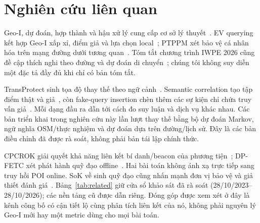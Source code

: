 \section{Nghiên cứu liên quan}\label{sec:related}
Geo-I, dự đoán, hợp thành và hậu xử lý cung cấp cơ sở
lý thuyết~\cite{geoi,predictive,dworkroth}. EV querying kết hợp Geo-I xấp xỉ,
điểm giả và lựa chọn local~\cite{ev}; PTPPM xét bảo vệ cá nhân hóa trên mạng
đường dưới tương quan~\cite{ptppm}. Tóm tắt chương trình IWPE 2026 cũng đề cập
thích nghi theo đường và dự đoán di chuyển~\cite{iwpe26}; chúng tôi không suy
diễn một đặc tả đầy đủ khi chỉ có bản tóm tắt.

TransProtect sinh tọa độ thay thế theo ngữ cảnh~\cite{transprotect}.
Semantic correlation tạo tập điểm thật và giả~\cite{semantic}, còn fake-query
insertion chèn thêm các sự kiện chỉ chứa truy vấn giả~\cite{fake}.
Mỗi dạng đầu ra dẫn tới cách đo suy luận và dịch vụ khác nhau. Các bản triển
khai trong nghiên cứu này lần lượt thay thế bằng bộ dự đoán Markov, ngữ nghĩa
OSM/thực nghiệm và dự đoán dựa trên đường/lịch sử. Đây là các bản điều chỉnh
đã được rà soát, không phải bản tái lập chính thức.

CPCROK giải quyết khả năng liên kết bí danh/beacon của phương
tiện~\cite{cpcrok}; DP-FETC xét phát hành quỹ đạo offline~\cite{dpfetc}.
Hai bài toán không ánh xạ trực tiếp sang truy hồi POI online. SoK về sinh
quỹ đạo cũng nhấn mạnh đơn vị bảo vệ và giả thiết đánh giá~\cite{sok}.
Bảng~\ref{tab:related} giữ cửa sổ khảo sát đã rà soát
(28/10/2023--28/10/2026); các nền tảng cũ được dẫn riêng.
Đóng góp được xem xét ở đây là kênh công bố có cận tiết lộ cùng phân tích
liên kết của nó, không phải nguyên lý Geo-I mới hay một metric dùng cho mọi bài toán.


